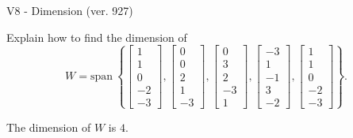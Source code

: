 \begin{exercise}
  \begin{exerciseTitle}V8 - Dimension (ver. 927)\end{exerciseTitle}
  \begin{exerciseStatement}
    Explain how to find the dimension of 
\[W=\mathrm{span}\ \left\{\left[\begin{array}{r}
1 \\
1 \\
0 \\
-2 \\
-3
\end{array}\right] , \left[\begin{array}{r}
0 \\
0 \\
2 \\
1 \\
-3
\end{array}\right] , \left[\begin{array}{r}
0 \\
3 \\
2 \\
-3 \\
1
\end{array}\right] , \left[\begin{array}{r}
-3 \\
1 \\
-1 \\
3 \\
-2
\end{array}\right] , \left[\begin{array}{r}
1 \\
1 \\
0 \\
-2 \\
-3
\end{array}\right]\right\}.\]



  \end{exerciseStatement}
  \begin{exerciseAnswer}
   The dimension of \(W\) is  \(4\).
  


  \end{exerciseAnswer}
\end{exercise}